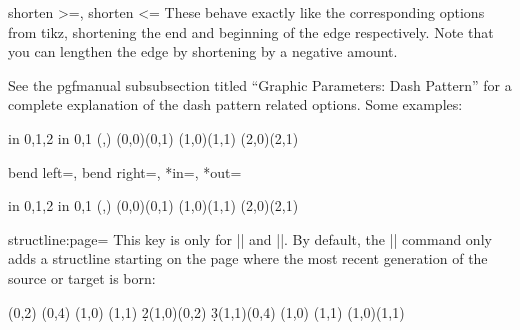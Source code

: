 \documentclass{ltxdoc}
\newenvironment{manualentry}[1]{
    \begin{pgfmanualentry}
    \pgfmanualentryheadline{#1}
    \pgfmanualbody
}{
    \end{pgfmanualentry}
}
\begin{document}
\begin{sseqdata}[name=ex1,degree={#1}{1-#1}]
\begin{keylist}{shorten >=, shorten <=}
These behave exactly like the corresponding options from tikz, shortening the end and beginning of the edge respectively. Note that you can lengthen the edge by shortening by a negative amount.
\end{keylist}

\begin{manualentry}{Dash patterns:}
See the pgfmanual subsubsection titled ``Graphic Parameters: Dash Pattern'' for a complete explanation of the dash pattern related options. Some examples:
\begin{codeexample}[]
\begin{sseqpage}[no axes]
\foreach\x in {0,1,2} \foreach\y in {0,1}{
    \class(\x,\y)
}
(0,0)(0,1)
(1,0)(1,1)
(2,0)(2,1)
\end{sseqpage}
\end{codeexample}
%
\end{manualentry}

\begin{keylist}{bend left=, bend right=, *in=, *out=}
\begin{codeexample}[]
\begin{sseqpage}[no axes]
\foreach\x in {0,1,2} \foreach\y in {0,1}{
    \class(\x,\y)
}
\structline[bend left=20](0,0)(0,1)
\structline[bend right=20](1,0)(1,1)
\structline[in=20,out=north](2,0)(2,1)
\end{sseqpage}
\end{codeexample}
\end{keylist}

\begin{key}{structline:page=}
This key is only for |\structline| and |\structlineoptions|. By default, the |\structline| command only adds a structline starting on the page where the most recent generation of the source or target is born:

\begin{codeexample}[width=8cm]
\begin{sseqdata}[name=structpage example,title=\page]
\class(0,2)
\class(0,4)
\class(1,0)
\class(1,1)
\d2(1,0)(0,2)
\d3(1,1)(0,4)
\replaceclass(1,0)
\replaceclass(1,1)
\structline(1,0)(1,1)
\end{sseqdata}
\printpage[name=structpage example,page=3]
\printpage[name=structpage example,page=4]
\end{codeexample}


\end{key}
\end{sseqdata}
\end{document}

